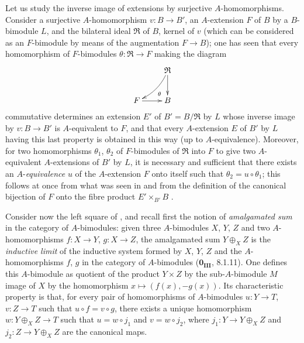 \begin{env}[18.2.6]
\label{0.18.2.6}
Let us study the inverse image of extensions by surjective $A$-homomorphisms.
Consider a surjective $A$-homomorphism $v:B\to B'$, an $A$-extension $F$ of $B$ by a $B$-bimodule $L$, and the bilateral ideal $\mathfrak{R}$ of $B$, kernel of $v$ (which can be considered as an $F$-bimodule by means of the augmentation $F\to B$); one has seen  that every homomorphism of $F$-bimodules $\theta:\mathfrak{R}\to F$ making the diagram
\[
  \xymatrix{
    & \mathfrak{R}\ar@/^/[ld]^\theta\ar[d]\\
    F\ar[r] & B
  }
\]
commutative determines an extension $E'$ of $B'=B/\mathfrak{R}$ by $L$ whose inverse image by $v:B\to B'$ is $A$-equivalent to $F$, and that every $A$-extension $E$ of $B'$ by $L$ having this last property is obtained in this way (up to $A$-equivalence).
Moreover, for two homomorphisms $\theta_1$, $\theta_2$ of $F$-bimodules of $\mathfrak{R}$ into $F$ to give two $A$-equivalent $A$-extensions of $B'$ by $L$, it is necessary and sufficient that there exists an $A$-\emph{equivalence} $u$ of the $A$-extension $F$ onto itself such that
$\theta_2=u\circ\theta_1$; this follows at once from what was seen in  and from the definition of the canonical bijection of $F$ onto the fibre product $E'\times_{B'}B$ .
\end{env}

\begin{env}[18.2.7]
\label{0.18.2.7}
Consider now the left square of , and recall first the notion of \emph{amalgamated sum} in the category of $A$-bimodules: given three $A$-bimodules $X$, $Y$, $Z$ and two $A$-homomorphisms $f:X\to Y$, $g:X\to Z$, the amalgamated sum $Y\oplus_X Z$ is the \emph{inductive limit} of the inductive system formed by $X$, $Y$, $Z$ and the $A$-homomorphisms $f$, $g$ in the category of $A$-bimodules ($\mathbf{0_{III}}$, 8.1.11).
One defines this $A$-bimodule as quotient of the product $Y\times Z$ by the sub-$A$-bimodule $M$ image of $X$ by the homomorphism $x\mapsto(f(x),-g(x))$.
Its characteristic property is that, for every pair of homomorphisms of $A$-bimodules $u:Y\to T$, $v:Z\to T$ such that $u\circ f=v\circ g$, there exists a unique homomorphism $w:Y\oplus_X Z\to T$ such that $u=w\circ j_1$ and $v=w\circ j_2$, where $j_1:Y\to Y\oplus_X Z$ and $j_2:Z\to Y\oplus_X Z$ are the canonical maps.
\end{env}

